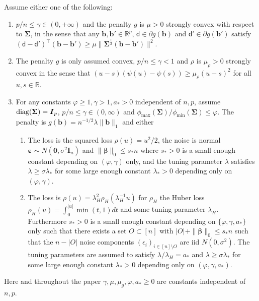 \documentclass[11pt]{amsart}
\numberwithin{equation}{section}
\numberwithin{equation}{section}
\def\constants{\gamma,\mu,\mu_g,\varphi,a_*}
\def\real{{\mathbb{R}}}
\def\R{{\real}}
\def\diag{\hbox{\rm diag}}
\def\mathbold{\boldsymbol} %
\def\bb{\mathbold{b}}\def\bhat{\widehat{b}}\def\btil{\widetilde{b}}
\def\bI{\mathbold{I}}\def\hbI{{\widehat{\bI}}}\def\tbI{{\widetilde{\bI}}}
\def\bbeta{\mathbold{\beta}}\def\betahat{\widehat{\beta}}\def\hbeta{\widehat{\beta}}
\def\ep{\varepsilon}\def\eps{\epsilon}\def\veps{\varepsilon}
\def\bep{ {\mathbold{\ep} }}
\def\bSigma{\mathbold{\Sigma}}\def\hbSigma{{\widehat{\bSigma}}}
\newcommand\pb[1]{{ #1 }}
\begin{document}
\begin{assumption}[Penalty]
    \label{assum:g}
    Assume either one of the following:
    \begin{enumerate}
        \item $p/n\le \gamma\in (0,+\infty)$
            and the penalty $g$ is $\mu>0$ strongly convex with respect to $\bSigma$,
            in the sense
            that any $\bb,\bb'\in\R^p$,
            $\mathsf{d}\in\partial g(\bb)$ and
            $\mathsf{d}'\in\partial g(\bb')$
            satisfy
            $(\mathsf d - \mathsf d')^\top(\bb - \bb') \ge \mu \|\bSigma^{\frac12}(\bb-\bb')\|^2$.
        \item The penalty $g$ is only assumed convex, $p/n\le\gamma < 1$
            and $\rho$ is $\mu_\rho>0$ strongly convex
            in the sense that $(u-s)(\psi(u)-\psi(s))\ge\mu_\rho(u-s)^2$ for all $u,s\in\R$.
        \item 
            For any constants $\varphi\ge 1, \gamma>1,a_*>0$
            independent of $n,p$, assume
    $\diag(\bSigma)=\bI_p$,
    $p/n\le\gamma\in (0,\infty)$ and
    $\phi_{\max}(\bSigma)/\phi_{\min}(\bSigma)\le\varphi$.
    The penalty is $g(\bb)=\pb{n^{-1/2}}\lambda\|\bb\|_1$
    and either
    \begin{enumerate}
\item The loss is the squared loss $\rho(u)=u^2/2$,
    the noise is normal $\bep\sim N(\mathbf{0},\sigma^2\bI_n)$
    and $\|\bbeta\|_0 \le s_* n$
    where $s_*>0$ is a small enough constant
    depending on $(\varphi,\gamma)$ only,
    and the tuning parameter $\lambda$ satisfies
    $\lambda\ge \sigma \lambda_*$
    for some large enough constant $\lambda_*>0$ depending only
    on $(\varphi,\gamma)$.
\item
    The loss is
    $\rho(u) = \lambda_H^2  \rho_H(\lambda_H^{-1}u)$ for $\rho_H$ the Huber loss $\rho_H(u)=\int_0^{|u|}\min(t,1)dt$
    and some tuning parameter $\lambda_H$.
    Furthermore 
    $s_*>0$ is a small enough constant
    depending on $\{\varphi,\gamma,a_*\}$ only
    such that there exists a set $O\subset [n]$
    with $|O|+\|\bbeta\|_0\le s_*n$ such that the $n-|O|$ noise components
    $(\eps_i)_{i\in[n]\setminus O}$ are iid $N(0,\sigma^2)$.
    The tuning parameters are assumed to satisfy
    $\lambda/\lambda_H=a_*$ and 
    $\lambda\ge \sigma \lambda_*$
    for some large enough constant $\lambda_*>0$ depending only
    on $(\varphi,\gamma,a_*)$.
    \end{enumerate}
    \end{enumerate}
    Here and throughout the paper $\constants\ge0$
    are constants independent of $n,p$.
\end{assumption}
\end{document}
